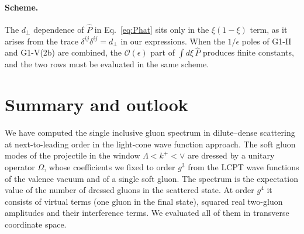\documentclass[aps,prd,onecolumn,superscriptaddress,nofootinbib,floatfix,longbibliography,11pt]{revtex4-2}
\numberwithin{equation}{section}
\newcommand{\Phat}{\hat P}
\newcommand{\Ord}{\mathcal{O}}
\begin{document}
\paragraph*{Scheme.} The $d_\perp$ dependence of $\Phat$ in Eq.~\eqref{eq:Phat} sits only in the $\xi(1-\xi)$ term, as it arises from the trace $\delta^{ij}\delta^{ij}=d_\perp$ in our expressions. When the $1/\epsilon$ poles of G1-II and G1-V(2b) are combined, the $\Ord(\epsilon)$ part of $\int d\xi\,\Phat$ produces finite constants, and the two rows must be evaluated in the same scheme.
\section{Summary and outlook}\label{sec:summary}

We have computed the single inclusive gluon spectrum in dilute--dense scattering at next-to-leading order in the light-cone wave function approach. The soft gluon modes of the projectile in the window $\Lambda<k^+<\vee$ are dressed by a unitary operator $\Omega$, whose coefficients we fixed to order $g^3$ from the LCPT wave functions of the valence vacuum and of a single soft gluon. The spectrum is the expectation value of the number of dressed gluons in the scattered state. At order $g^4$ it consists of virtual terms (one gluon in the final state), squared real two-gluon amplitudes and their interference terms. We evaluated all of them in transverse coordinate space.
\end{document}
